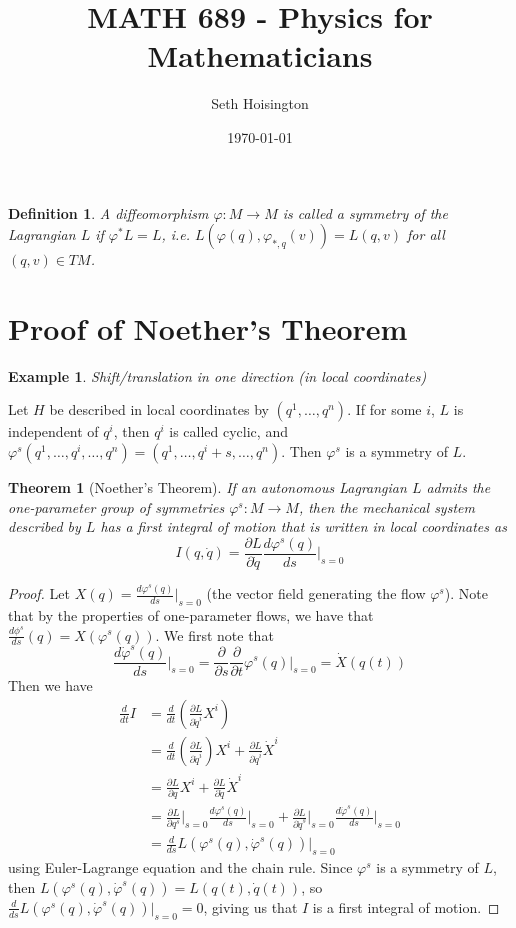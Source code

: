 \documentclass{article}
\title{MATH 689 - Physics for Mathematicians}
\author{Seth Hoisington}
\date{\today}
\newcommand{\vhi}{\varphi}
\newcommand{\pd}[1]{\frac{\partial}{\partial #1}}
\newcommand{\pdof}[2]{\frac{\partial #1}{\partial #2}}
\newtheorem{thm}{Theorem}
\newtheorem{ex}{Example}
\newtheorem{defn}{Definition}
\begin{document}
\maketitle

\begin{defn}
    A diffeomorphism $\vhi:M\to M$ is called a symmetry of the Lagrangian $L$ if $\vhi^*L = L$, i.e. $L(\vhi(q),\vhi_{*,q}(v)) = L(q,v)$ for all $(q,v)\in TM$.
\end{defn}

\section{Proof of Noether's Theorem}
\begin{ex}
    Shift/translation in one direction (in local coordinates)
\end{ex}
Let $H$ be described in local coordinates by $(q^1,\dots,q^n)$. If for some $i$, $L$ is independent of $q^i$, then $q^i$ is called cyclic, and $\vhi^s(q^1,\dots, q^i,\dots,q^n) = (q^1,\dots, q^i+s,\dots,q^n)$. Then $\vhi^s$ is a symmetry of $L$.
\begin{thm}[Noether's Theorem]
    If an autonomous Lagrangian $L$ admits the one-parameter group of symmetries $\vhi^s:M\to M$, then the mechanical system described by $L$ has a first integral of motion that is written in local coordinates as 
\[I(q,\dot q) = \pdof{L}{\dot q}\frac{d\vhi^s(q)}{ds}\bigg|_{s=0}\]
\end{thm}
\begin{proof}
    Let $X(q)=\frac{d\vhi^s(q)}{ds}\bigg|_{s=0}$ (the vector field generating the flow $\vhi^s$). Note that by the properties of one-parameter flows, we have that $\frac{d\phi^s}{ds}(q)=X(\vhi^s(q))$. We first note that
    \[\frac{d\dot\vhi^s(q)}{ds}\bigg|_{s=0} = \pd{s}\pd{t}\vhi^s(q)|_{s=0} = \dot X(q(t))\]
    Then we have
    \begin{align*}
        \frac{d}{dt}I &= \frac{d}{dt}\left(\pdof{L}{\dot q^i}X^i\right) \\
        &= \frac{d}{dt}\left(\pdof{L}{\dot q^i}\right)X^i+\pdof{L}{\dot q^i}\dot X^i\\
        &= \pdof{L}{q}X^i+\pdof{L}{\dot q}\dot X^i\\
        &= \pdof{L}{q^s}\bigg|_{s=0}\frac{d\vhi^s(q)}{ds}\bigg|_{s=0} + \pdof{L}{\dot q^s}\bigg|_{s=0}\frac{d\dot\vhi^s(q)}{ds}\bigg|_{s=0}\\
        &=\frac{d}{ds}L(\vhi^s(q),\dot\vhi^s(q))\big|_{s=0}
    \end{align*}
    using Euler-Lagrange equation and the chain rule.
    Since $\vhi^s$ is a symmetry of $L$, then $L(\vhi^s(q),\dot\vhi^s(q)) = L(q(t),\dot q(t))$, so $\frac{d}{ds}L(\vhi^s(q),\dot\vhi^s(q))\big|_{s=0} = 0$, giving us that $I$ is a first integral of motion.
\end{proof}
\end{document}
